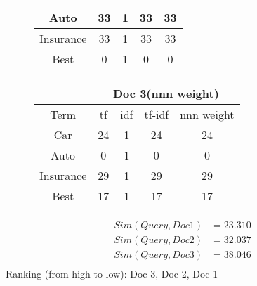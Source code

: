 \documentclass[11pt]{article}
\begin{document}
\begin{figure}[H]
\begin{minipage}{0.5\linewidth}
\begin{table}[H]
\begin{tabular}{|c|c|c|c|c|}
        Auto     & 33 &1    & 33& 33\\ \hline
        Insurance& 33 &1    & 33& 33\\ \hline
        Best     & 0  &1    & 0 & 0\\ \hline
      \end{tabular}
    \end{table}
  \end{minipage}
  \begin{minipage}{0.5\linewidth}
    \begin{table}[H]
      \centering
      \begin{tabular}{|c|c|c|c|c|} \hline
        & \multicolumn{4}{|c|}{Doc 3(nnn weight)}\\ \hline
        Term     & tf & idf & tf-idf & nnn weight \\ \hline
        Car      & 24 &1 & 24& 24 \\ \hline
        Auto     & 0  &1 & 0& 0\\ \hline
        Insurance& 29 &1 & 29& 29\\ \hline
        Best     & 17 &1 & 17& 17\\ \hline
      \end{tabular}
    \end{table}
  \end{minipage}
\end{figure}
\begin{align*}
  Sim(Query, Doc 1) &= 23.310 \\
  Sim(Query, Doc 2) &= 32.037 \\
  Sim(Query, Doc 3) &= 38.046 \\
\end{align*}
Ranking (from high to low): Doc 3, Doc 2, Doc 1
\end{document}
